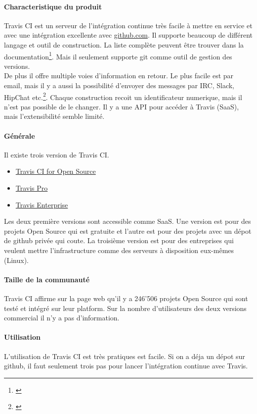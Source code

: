 \paragraph{Characteristique du produit}
Travis CI est un serveur de l'intégration continue très facile à mettre en service et avec une intégration excellente avec \href{https://github.com/}{github.com}. Il supporte beaucoup de différent langage et outil de construction. La liste complète peuvent être trouver dans la documentation\footnote{\citep{traviscidocs}}. Mais il seulement supporte git comme outil de gestion des versions.\\
De plus il offre multiple voies d'information en retour. Le plus facile est par email, mais il y a aussi la possibilité d'envoyer des messages par IRC, Slack, HipChat etc.\footnote{\citep{traviscinotification}}. Chaque construction recoit un identificateur numerique, mais il n'est pas possible de le changer. Il y a une API pour accéder à Travis (SaaS), mais l'extensibilité semble limité.

\paragraph{Générale}
Il existe trois version de Travis CI.
\begin{itemize}
	\item \href{https://travis-ci.org/}{Travis CI for Open Source}
	\item \href{https://travis-ci.com/}{Travis Pro}
	\item \href{https://enterprise.travis-ci.com/}{Travis Enterprise}
\end{itemize}
Les deux première versions sont accessible comme SaaS. Une version est pour des projets Open Source qui est gratuite et l'autre est pour des projets avec un dépot de github privée qui coute. La troisième version est pour des entreprises qui veulent mettre l'infrastructure comme des serveurs à disposition eux-mêmes (Linux).

\paragraph{Taille de la communauté}
Travis CI affirme sur la page web qu'il y a 246'506 projets Open Source qui sont testé et intégré sur leur platform. Sur la nombre d'utilisateurs des deux versions commercial il n'y a pas d'information.

\paragraph{Utilisation}
L'utilisation de Travis CI est très pratiques est facile. Si on a déja un dépot sur github, il faut seulement trois pas pour lancer l'intégration continue avec Travis.

